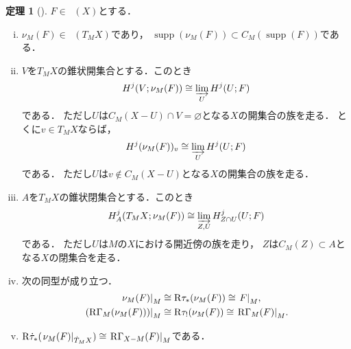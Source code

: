 \documentclass[uplatex,dvipdfmx,a4paper,10pt,draft]{jsarticle}
\theoremstyle{definition}
\newcommand{\rr}{\mathbf{R}}
\numberwithin{equation}{section}
\newcommand{\supp}{\mathop{\mathrm{supp}}\nolimits}
\newcommand{\Dompb}{\mathop{\mathsf{D}^\mathrm{b}}\nolimits}
\newcommand{\RG}{\mathop{\mathrm{R}\hspace{-0pt}\Gamma}\nolimits}
\newcommand{\Rder}{\mathrm{R}}
\newcommand{\indlim}[1][]{\mathop{\varinjlim}\limits_{#1}}
\newcommand{\mres}[2][]{{\left.{#1}\right\rvert}_{#2}}
\theoremstyle{mystyle}
\newtheorem{mythm}{定理}[section]
\newenvironment{thm}{\begin{thmbox}\begin{mythm}}{\end{mythm}\end{thmbox}}
\newcommand{\Dbcon}{\mathop{\mathsf{D}^{\mathrm{b}}_{\rr^+}}\nolimits}
\begin{document}
\begin{thm}[{\cite[Thm 4.2.3]{KS90}}]
    \(F\in\Dompb(X)\)とする．
    \begin{enumerate}[(i)]
        \item \(\nu_{M}(F)\in\Dbcon(T_{M}X)\)であり，
        \(\supp(\nu_{M}(F))\subset C_{M}(\supp(F))\)である．
        \item \(V\)を\(T_{M}X\)の錐状開集合とする．このとき\[
            H^{j}(V;\nu_{M}(F))
            \cong
            \indlim[U]H^{j}(U;F)
        \]である．
        ただし\(U\)は\(
            C_{M}(X-U)\cap V=\varnothing
        \)となる\(X\)の開集合の族を走る．
        とくに\(v\in T_{M}X\)ならば，
        \[
            H^{j}(\nu_{M}(F))_{v}
            \cong
            \indlim[U]H^{j}(U;F)
        \]である．
        ただし\(U\)は\(
            v\notin C_{M}(X-U)
        \)となる\(X\)の開集合の族を走る．
        \item \(A\)を\(T_{M}X\)の錐状閉集合とする．このとき\[
            H^{j}_{A}(T_{M}X;\nu_{M}(F))
            \cong
            \indlim[Z,U]H^{j}_{Z\cap U}(U;F)
        \]である．
        ただし\(U\)は\(
            M
        \)の\(X\)における開近傍の族を走り，
        \(Z\)は\(C_{M}(Z)\subset A\)となる\(X\)の閉集合を走る．
        \item 次の同型が成り立つ．\begin{align*}
            \mres[\nu_{M}(F)]{M}&\cong \Rder{\tau}_{\ast}(\nu_{M}(F))\cong \mres[F]{M},\\
            \mres[(\RG_{M}(\nu_{M}(F)))]{M}&\cong \Rder{\tau}_{!}(\nu_{M}(F))\cong \mres[\RG_{M}(F)]{M}.
        \end{align*}
        \item \(\Rder{\dot{\tau}}_{\ast}(\mres[\nu_{M}(F)]{\dot{T}_{M}X})\cong\mres[\RG_{X-M}(F)]{M}\)である．
    \end{enumerate}
\end{thm}
\end{document}
